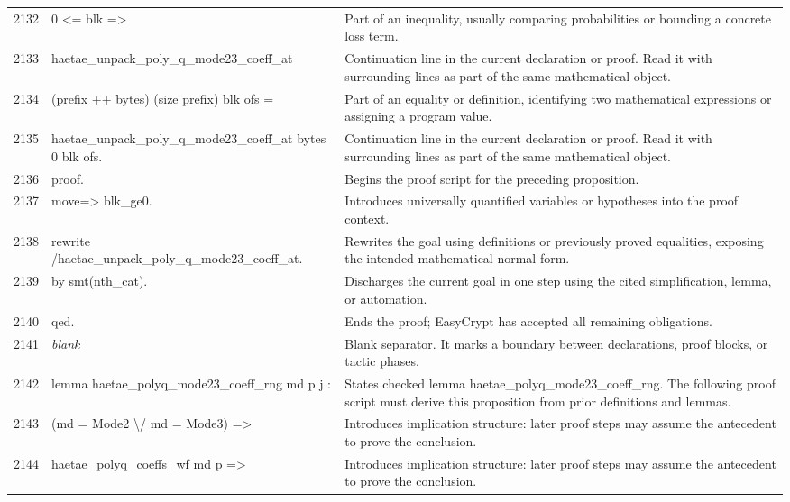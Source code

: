 \documentclass[10pt]{article}
\begin{document}
\begin{longtable}{r L{0.53\textwidth} L{0.37\textwidth}}
2132 & {\ttfamily\scriptsize   0 <= blk =>} & Part of an inequality, usually comparing probabilities or bounding a concrete loss term. \\
2133 & {\ttfamily\scriptsize   haetae\_unpack\_poly\_q\_mode23\_coeff\_at} & Continuation line in the current declaration or proof.  Read it with surrounding lines as part of the same mathematical object. \\
2134 & {\ttfamily\scriptsize     (prefix ++ bytes) (size prefix) blk ofs =} & Part of an equality or definition, identifying two mathematical expressions or assigning a program value. \\
2135 & {\ttfamily\scriptsize   haetae\_unpack\_poly\_q\_mode23\_coeff\_at bytes 0 blk ofs.} & Continuation line in the current declaration or proof.  Read it with surrounding lines as part of the same mathematical object. \\
2136 & {\ttfamily\scriptsize proof.} & Begins the proof script for the preceding proposition. \\
2137 & {\ttfamily\scriptsize move=> blk\_ge0.} & Introduces universally quantified variables or hypotheses into the proof context. \\
2138 & {\ttfamily\scriptsize rewrite /haetae\_unpack\_poly\_q\_mode23\_coeff\_at.} & Rewrites the goal using definitions or previously proved equalities, exposing the intended mathematical normal form. \\
2139 & {\ttfamily\scriptsize by smt(nth\_cat).} & Discharges the current goal in one step using the cited simplification, lemma, or automation. \\
2140 & {\ttfamily\scriptsize qed.} & Ends the proof; EasyCrypt has accepted all remaining obligations. \\
2141 & {\ttfamily\scriptsize \emph{blank}} & Blank separator.  It marks a boundary between declarations, proof blocks, or tactic phases. \\
2142 & {\ttfamily\scriptsize lemma haetae\_polyq\_mode23\_coeff\_rng md p j :} & States checked lemma haetae\_polyq\_mode23\_coeff\_rng.  The following proof script must derive this proposition from prior definitions and lemmas. \\
2143 & {\ttfamily\scriptsize   (md = Mode2 \textbackslash{}/ md = Mode3) =>} & Introduces implication structure: later proof steps may assume the antecedent to prove the conclusion. \\
2144 & {\ttfamily\scriptsize   haetae\_polyq\_coeffs\_wf md p =>} & Introduces implication structure: later proof steps may assume the antecedent to prove the conclusion. \\

\end{longtable}
\end{document}
